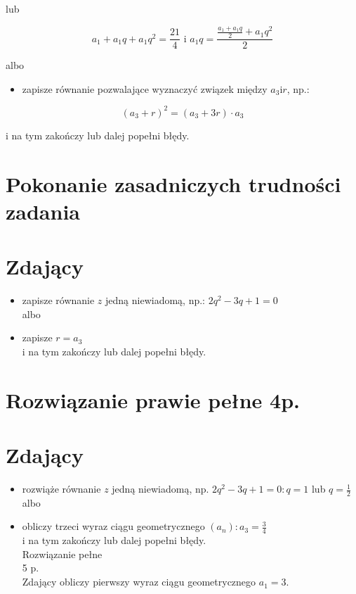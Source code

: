 \documentclass[10pt]{article}
\begin{document}
lub

$$
a_{1}+a_{1} q+a_{1} q^{2}=\frac{21}{4} \text { i } a_{1} q=\frac{\frac{a_{1}+a_{1} q}{2}+a_{1} q^{2}}{2}
$$

albo

\begin{itemize}
  \item zapisze równanie pozwalające wyznaczyć związek między $a_{3} \mathrm{i} r$, np.:
\end{itemize}

$$
\left(a_{3}+r\right)^{2}=\left(a_{3}+3 r\right) \cdot a_{3}
$$

i na tym zakończy lub dalej popełni błędy.

\section*{Pokonanie zasadniczych trudności zadania}
\section*{Zdający}
\begin{itemize}
  \item zapisze równanie $z$ jedną niewiadomą, np.: $2 q^{2}-3 q+1=0$\\
albo
  \item zapisze $r=a_{3}$\\
i na tym zakończy lub dalej popełni błędy.
\end{itemize}

\section*{Rozwiązanie prawie pełne 4p.}
\section*{Zdający}
\begin{itemize}
  \item rozwiąże równanie $z$ jedną niewiadomą, np. $2 q^{2}-3 q+1=0: q=1$ lub $q=\frac{1}{2}$\\
albo
  \item obliczy trzeci wyraz ciągu geometrycznego $\left(a_{n}\right): a_{3}=\frac{3}{4}$\\
i na tym zakończy lub dalej popełni błędy.\\
Rozwiązanie pełne\\
5 p.\\
Zdający obliczy pierwszy wyraz ciągu geometrycznego $a_{1}=3$.
\end{itemize}
\end{document}
